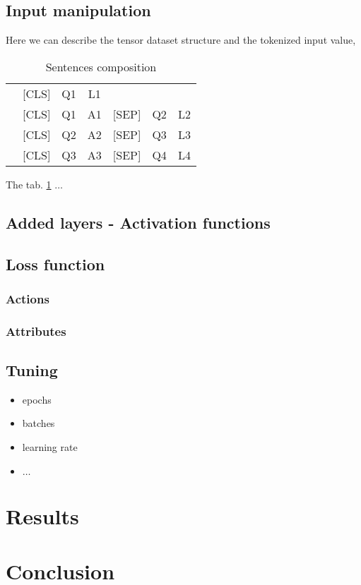\documentclass[final]{cvpr}
\begin{document}
	\subsection{Input manipulation}
	Here we can describe the tensor dataset structure and the tokenized input value, \eg

	\begin{table}[h]
		\centering

		\begin{tabular}{lcccccc}
			\rowcolor[gray]{0.9}
			& [CLS] & Q1 & L1 & & & \\
			\rowcolor[gray]{0.97}
			& [CLS] & Q1 & A1 & [SEP] & Q2 & L2 \\
			\rowcolor[gray]{0.9}
			& [CLS] & Q2 & A2 & [SEP] & Q3 & L3 \\
			\rowcolor[gray]{0.97}
			& [CLS] & Q3 & A3 & [SEP] & Q4 & L4 \\
		\end{tabular}
		
		\caption{\small{Sentences composition}}
		\label{tab:sentcomp}
	\end{table}

	The tab. \ref{tab:sentcomp} $\ldots$
		
	\subsection{Added layers - Activation functions}
	
	\subsection{Loss function}
	
	\subsubsection{Actions}
	\subsubsection{Attributes}
	
	\subsection{Tuning}
	\begin{itemize}
		\item epochs
		\item batches
		\item learning rate
		\item $\ldots$
	\end{itemize}

	\section{Results}

	\section{Conclusion}
	
	
	{\small
		
		
	}
	
\end{document}
